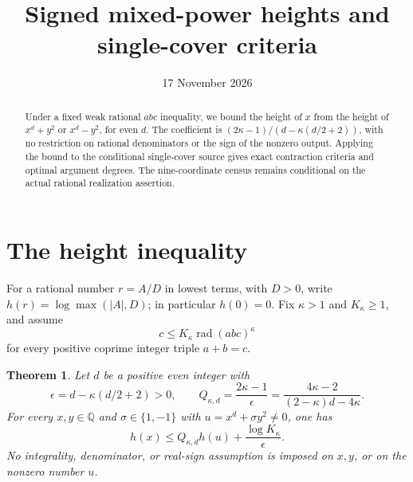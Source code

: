 \documentclass[11pt,a4paper]{article}
\title{Signed mixed-power heights and single-cover criteria}
\author{}\date{17 November 2026}
\newtheorem{theorem}{Theorem}[section]
\newcommand{\Q}{\mathbb Q}\newcommand{\Z}{\mathbb Z}
\DeclareMathOperator{\rad}{rad}
\begin{document}
\maketitle
\begin{abstract}
Under a fixed weak rational $abc$ inequality, we bound the height of $x$
from the height of $x^d+y^2$ or $x^d-y^2$, for even $d$. The coefficient
is $(2\kappa-1)/(d-\kappa(d/2+2))$, with no restriction on rational
denominators or the sign of the nonzero output. Applying the bound to
the conditional single-cover source gives exact contraction criteria
and optimal argument degrees. The nine-coordinate census
remains conditional on the actual rational realization assertion.
\end{abstract}

\section{The height inequality}

For a rational number $r=A/D$ in lowest terms, with $D>0$, write
$h(r)=\log\max(|A|,D)$; in particular $h(0)=0$.
Fix $\kappa>1$ and $K_\kappa\ge1$, and assume
\begin{equation}\label{eq:abc}
 c\le K_\kappa\rad(abc)^\kappa
\end{equation}
for every positive coprime integer triple $a+b=c$.

\begin{theorem}\label{thm:height}
Let $d$ be a positive even integer with
\[
 \epsilon=d-\kappa(d/2+2)>0,
 \qquad
 Q_{\kappa,d}=\frac{2\kappa-1}{\epsilon}
              =\frac{4\kappa-2}{(2-\kappa)d-4\kappa}.
\]
For every $x,y\in\Q$ and $\sigma\in\{1,-1\}$ with
$u=x^d+\sigma y^2\ne0$, one has
\begin{equation}\label{eq:bound}
 h(x)\le Q_{\kappa,d}h(u)+\frac{\log K_\kappa}{\epsilon}.
\end{equation}
No integrality, denominator, or real-sign assumption is imposed on
$x,y$, or on the nonzero number $u$.
\end{theorem}
\end{document}
